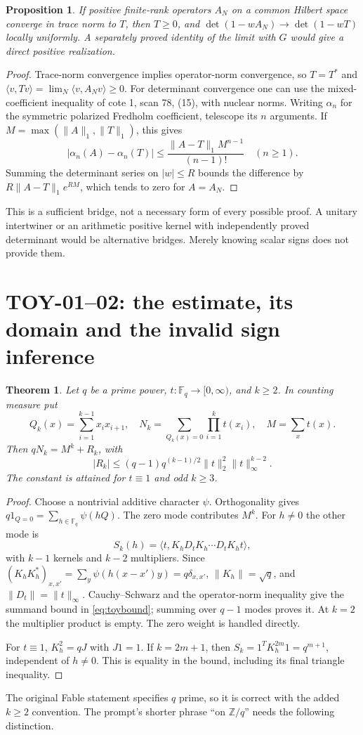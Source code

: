 \documentclass[11pt,a4paper]{article}
\newcommand{\Z}{\mathbb Z}
\newcommand{\F}{\mathbb F}
\newtheorem*{proposition}{Proposition}
\newtheorem*{theorem}{Theorem}
\begin{document}
\begin{proposition}
If positive finite-rank operators $A_N$ on a common Hilbert space converge in trace norm to $T$, then $T\ge0$, and $\det(1-wA_N)\to\det(1-wT)$ locally uniformly. A separately proved identity of the limit with $G$ would give a direct positive realization.
\end{proposition}
\begin{proof}
Trace-norm convergence implies operator-norm convergence, so $T=T^*$ and $\langle v,Tv\rangle=\lim_N\langle v,A_Nv\rangle\ge0$. For determinant convergence one can use the mixed-coefficient inequality of cote 1, scan 78, (15), with nuclear norms. Writing $\alpha_n$ for the symmetric polarized Fredholm coefficient, telescope its $n$ arguments. If $M=\max(\|A\|_1,\|T\|_1)$, this gives
\[
 |\alpha_n(A)-\alpha_n(T)|\le
 \frac{\|A-T\|_1M^{n-1}}{(n-1)!}\quad(n\ge1).
\]
Summing the determinant series on $|w|\le R$ bounds the difference by
$R\|A-T\|_1e^{RM}$, which tends to zero for $A=A_N$.
\end{proof}
This is a sufficient bridge, not a necessary form of every possible proof. A unitary intertwiner or an arithmetic positive kernel with independently proved determinant would be alternative bridges. Merely knowing scalar signs does not provide them.

\section{TOY-01--02: the estimate, its domain and the invalid sign inference}
\begin{theorem}
Let $q$ be a prime power, $t:\F_q\to[0,\infty)$, and $k\ge2$. In counting measure put
\[
 Q_k(x)=\sum_{i=1}^{k-1}x_ix_{i+1},\quad
 N_k=\sum_{Q_k(x)=0}\prod_{i=1}^kt(x_i),\quad M=\sum_x t(x).
\]
Then $qN_k=M^k+R_k$, with
\begin{equation}\label{eq:toybound}
 |R_k|\le(q-1)q^{(k-1)/2}\|t\|_2^2\|t\|_\infty^{k-2}.
\end{equation}
The constant is attained for $t\equiv1$ and odd $k\ge3$.
\end{theorem}
\begin{proof}
Choose a nontrivial additive character $\psi$. Orthogonality gives
$q1_{Q=0}=\sum_{h\in\F_q}\psi(hQ)$. The zero mode contributes $M^k$. For $h\ne0$ the other mode is
\[
 S_k(h)=\langle t,K_hD_tK_h\cdots D_tK_ht\rangle,
\]
with $k-1$ kernels and $k-2$ multipliers. Since
$(K_hK_h^*)_{x,x'}=\sum_y\psi(h(x-x')y)=q\delta_{x,x'}$,
$\|K_h\|=\sqrt q$, and $\|D_t\|=\|t\|_\infty$. Cauchy--Schwarz and the operator-norm inequality give the summand bound in \eqref{eq:toybound}; summing over $q-1$ modes proves it. At $k=2$ the multiplier product is empty. The zero weight is handled directly.

For $t\equiv1$, $K_h^2=qJ$ with $J1=1$. If $k=2m+1$, then $S_k=1^TK_h^{2m}1=q^{m+1}$, independent of $h\ne0$. This is equality in the bound, including its final triangle inequality.
\end{proof}
The original Fable statement specifies $q$ prime, so it is correct with the added $k\ge2$ convention. The prompt's shorter phrase ``on $\Z/q$'' needs the following distinction.
\end{document}
